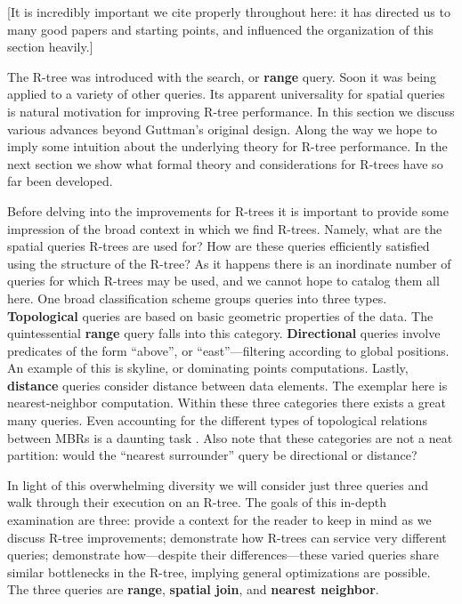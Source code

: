 \newcommand{\keyword}[1]{\textbf{#1}}

[It is incredibly important we cite \cite{thebook} properly throughout here: it has directed us to many good papers and starting points, and influenced the organization of this section heavily.]

The R-tree was introduced with the search, or \keyword{range} query.
Soon it was being applied to a variety of other queries.
Its apparent universality for spatial queries is natural motivation for improving R-tree performance.
In this section we discuss various advances beyond Guttman's original design.
Along the way we hope to imply some intuition about the underlying theory for R-tree performance.
In the next section we show what formal theory and considerations for R-trees have so far been developed.

Before delving into the improvements for R-trees it is important to provide some impression of the broad context in which we find R-trees.
Namely, what are the spatial queries R-trees are used for?
How are these queries efficiently satisfied using the structure of the R-tree?
As it happens there is an inordinate number of queries for which R-trees may be used, and we cannot hope to catalog them all here.
One broad classification scheme groups queries into three types.
\keyword{Topological} queries are based on basic geometric properties of the data.
The quintessential \keyword{range} query falls into this category.
\keyword{Directional} queries involve predicates of the form ``above'', or ``east''---filtering according to global positions.
An example of this is skyline, or dominating points computations.
Lastly, \keyword{distance} queries consider distance between data elements.
The exemplar here is nearest-neighbor computation.
Within these three categories there exists a great many queries.
Even accounting for the different types of topological relations between MBRs is a daunting task \cite{papadiassellistheodoridisegenhofer95}.
Also note that these categories are not a neat partition: would the ``nearest surrounder'' query be directional or distance?

In light of this overwhelming diversity we will consider just three queries and walk through their execution on an R-tree.
The goals of this in-depth examination are three:
provide a context for the reader to keep in mind as we discuss R-tree improvements;
demonstrate how R-trees can service very different queries;
demonstrate how---despite their differences---these varied queries share similar bottlenecks in the R-tree, implying general optimizations are possible.
The three queries are \keyword{range}, \keyword{spatial join}, and \keyword{nearest neighbor}.

